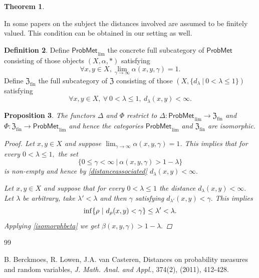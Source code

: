 \documentclass[12pt,a4paper]{amsart}
\theoremstyle{theorem}
\newtheorem{theorem}{Theorem}[section]
\newtheorem{proposition}[theorem]{Proposition}
\theoremstyle{definition}
\newtheorem{definition}[theorem]{Definition}
\newcommand{\zz}{\ensuremath{\mathfrak{Z}}}
\newcommand{\PM}{\ensuremath{\mathsf{ProbMet_{}}}}
\renewcommand{\inf}{\myinf}
\DeclareMathOperator*{\myinf}{in\vphantom{p}f}
\renewcommand{\a}{\ensuremath{\alpha}}
\renewcommand{\b}{\ensuremath{\beta}}
\renewcommand{\l}{\ensuremath{\lambda}}
\def\rw{\rightarrow}
\begin{document}
{\begin{theorem}
\end{theorem}

In some papers on the subject the distances involved are assumed to be finitely valued. This condition can be obtained in our setting as well.

\begin{definition}
 Define $\PM_{\text{lim}}$ the concrete full subcategory of $\PM$ consisting of those objects $(X, \a, *)$ satisfying
 \begin{equation}\label {lim1}
 \forall x,y \in X,  \lim_{\gamma \rw \infty} \a(x,y,\gamma) = 1.
 \end{equation} 
 Define $\zz_{\text{fin}}$ the full subcategory of $\zz$ consisting of those $(X, \{ d_\l \ | \ 0 < \l \leq 1 \})$ satisfying
 \begin{equation}\label{fin}
 \forall x,y \in X, \ \forall \  0 < \l \leq 1, \ d_\l (x,y) < \infty.
 \end{equation}
\end{definition}

\begin{proposition}
The functors $\Delta$ and $\Phi$ restrict to $ \Delta : \PM_{\text{lim}} \rw  \zz_{\text{fin}}$ and $\Phi :  \zz_{\text{fin}} \rw \PM_{\text{lim}}$ and hence the categories 
$\PM_{\text{lim}}$ and  $\zz_{\text{fin}}$ are isomorphic.
\begin{proof}
Let $x,y \in X$ and suppose $\lim_{\gamma \rw \infty} \a (x,y, \gamma) = 1$. This implies that for every $0 < \l \leq 1,$ the set $$ \{ 0 \leq \gamma < \infty \ | \ \a(x,y,\gamma) > 1 - \l \}$$ is non-empty and hence by \eqref{distanceassociated} $d_\l(x,y) < \infty.$

Let $x,y \in X$ and suppose that for every $0 < \l \leq 1$ the distance $d_\l(x,y) < \infty.$ Let $\l$ be arbitrary, take $\l'<\l$ and then $\gamma$ satisfying
$d_{\l'}(x,y) < \gamma.$ This implies $$ \inf\{ \rho \ | \ d_\rho(x,y) <\gamma \} \leq \l' < \l.$$
Applying \eqref{isomorphbeta} we get $\b(x,y, \gamma) > 1 - \l.$

\end{proof}
\end{proposition}









\begin{thebibliography}{99}


 B. Berckmoes, R. Lowen, J.A. van Casteren, Distances on probability measures and random variables, \emph{J. Math. Anal. and Appl.}, 374(2), (2011), 412-428.


\end{thebibliography}}
\end{document}
